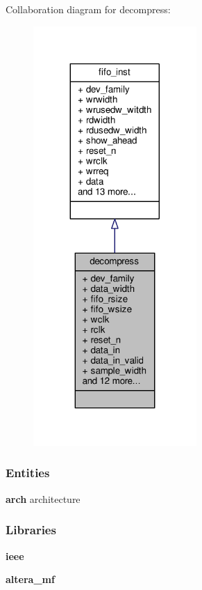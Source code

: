 Collaboration diagram for decompress\+:\nopagebreak
\begin{figure}[H]
\begin{center}
\leavevmode
\includegraphics[width=176pt]{d6/d1b/classdecompress__coll__graph}
\end{center}
\end{figure}
\subsubsection*{Entities}
\begin{DoxyCompactItemize}
\item 
{\bf arch} architecture
\end{DoxyCompactItemize}
\subsubsection*{Libraries}
 \begin{DoxyCompactItemize}
\item 
{\bf ieee} 
\item 
{\bf altera\+\_\+mf} 
\end{DoxyCompactItemize}
